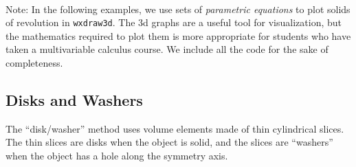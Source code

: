 \documentclass[10.5pt,twoside]{report}
\theoremstyle{definition}
\begin{document}
${}$\\

Note:  In the following examples, we use sets of \textit{parametric equations} to plot solids of revolution in \verb|wxdraw3d|.  The 3d graphs are a useful tool for visualization, but the mathematics required to plot them is more appropriate for students who have taken a multivariable calculus course.  We include all the code for the sake of completeness.

\subsection{Disks and Washers}

The ``disk/washer'' method uses volume elements made of thin cylindrical slices.  The thin slices are disks when the object is solid, and the slices are ``washers'' when the object has a hole along the symmetry axis.
\end{document}
